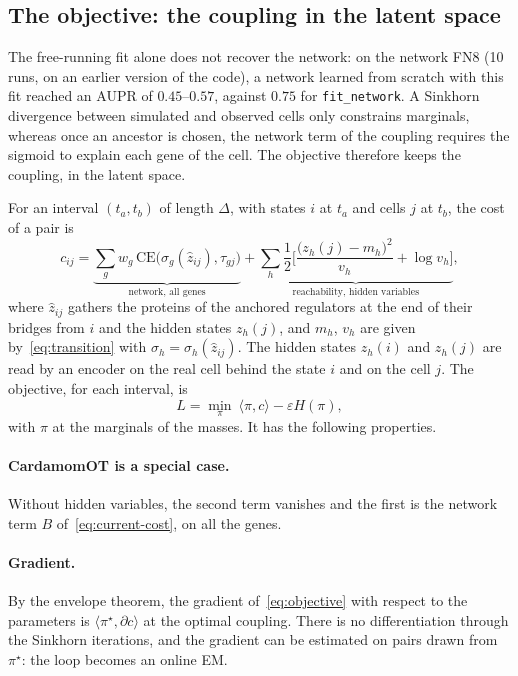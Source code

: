 \documentclass[a4paper, 11pt]{article}
\newcommand{\CE}{\mathrm{CE}}
\theoremstyle{plain}
\theoremstyle{remark}
\begin{document}
\subsection{The objective: the coupling in the latent space}\label{sec:objective}

The free-running fit alone does not recover the network: on the network FN8 (10 runs, on an earlier version of the code), a network learned from scratch with this fit reached an AUPR of $0.45$--$0.57$, against $0.75$ for \texttt{fit\_network}. A Sinkhorn divergence between simulated and observed cells only constrains marginals, whereas once an ancestor is chosen, the network term of the coupling requires the sigmoid to explain each gene of the cell. The objective therefore keeps the coupling, in the latent space.

For an interval $(t_a, t_b)$ of length $\Delta$, with states $i$ at $t_a$ and cells $j$ at $t_b$, the cost of a pair is
\begin{equation}\label{eq:cost}
c_{ij} = \underbrace{\sum_g w_g\, \CE\big(\sigma_g(\hat z_{ij}), \tau_{gj}\big)}_{\text{network, all genes}}
+ \underbrace{\sum_{h} \frac12 \Big[\frac{\big(z_h(j) - m_{h}\big)^2}{v_h} + \log v_h\Big]}_{\text{reachability, hidden variables}},
\end{equation}
where $\hat z_{ij}$ gathers the proteins of the anchored regulators at the end of their bridges from $i$ and the hidden states $z_h(j)$, and $m_h$, $v_h$ are given by~\eqref{eq:transition} with $\sigma_h = \sigma_h(\hat z_{ij})$. The hidden states $z_h(i)$ and $z_h(j)$ are read by an encoder on the real cell behind the state $i$ and on the cell $j$. The objective, for each interval, is
\begin{equation}\label{eq:objective}
L = \min_{\pi} \ \langle \pi, c \rangle - \varepsilon H(\pi),
\end{equation}
with $\pi$ at the marginals of the masses. It has the following properties.

\paragraph{CardamomOT is a special case.} Without hidden variables, the second term vanishes and the first is the network term $B$ of~\eqref{eq:current-cost}, on all the genes.

\paragraph{Gradient.} By the envelope theorem, the gradient of~\eqref{eq:objective} with respect to the parameters is $\langle \pi^\star, \partial c \rangle$ at the optimal coupling. There is no differentiation through the Sinkhorn iterations, and the gradient can be estimated on pairs drawn from $\pi^\star$: the loop becomes an online EM.
\end{document}
